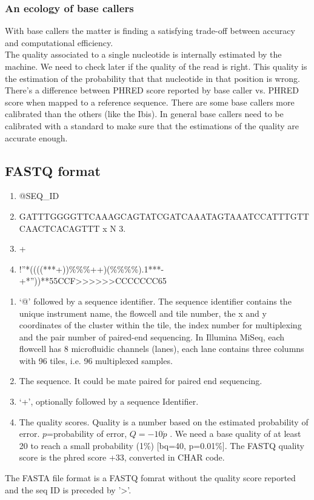 \begin{description}
\subsubsection{An ecology of base callers}
With base callers the matter is finding a satisfying trade-off between accuracy and computational efficiency.
\\
The quality associated to a single nucleotide is internally estimated by the machine. We need to check later if the quality of the read is right. This quality is the estimation of the probability that that nucleotide in that position is wrong. 
\\
There's a difference between PHRED score reported by base caller vs. PHRED score when mapped to a reference sequence. There are some base callers more calibrated than the others (like the Ibis). In general base callers need to be calibrated with a standard to make sure that the estimations of the quality are accurate enough. 

\subsection{FASTQ format}
\label{subsection:fastq}

\begin{enumerate}
\item @SEQ\_ID 
\item GATTTGGGGTTCAAAGCAGTATCGATCAAATAGTAAATCCATTTGTTCAACTCACAGTTT x N 3. 
\item + 
\item !''*((((***+))\%\%\%++)(\%\%\%\%).1***-+*''))**55CCF>>>>>>CCCCCCC65 
\end{enumerate}

\begin{enumerate}
\item ‘@’ followed by a sequence identifier. The sequence identifier contains the unique instrument name, the flowcell and tile number, the x and y coordinates of the cluster within the tile, the index number for multiplexing and the pair number of paired-end sequencing. In Illumina MiSeq, each flowcell has 8 microfluidic channels (lanes), each lane contains three columns with 96 tiles, i.e. 96 multiplexed samples.
\item The sequence. It could be mate paired for paired end sequencing.
\item ‘+’, optionally followed by a sequence Identifier.
\item The quality scores. Quality is a number based on the estimated probability of error. $p$=probability  of error, $Q = -10 \dot p$ . We need a base quality of at least 20 to reach a small probability (1\%) [bq=40, p=0.01\%]. The FASTQ quality score is the phred score +33, converted in CHAR code.
\end{enumerate}
The FASTA file format is a FASTQ fomrat without the quality score reported and the seq ID is preceded by '>'.


\end{description}
